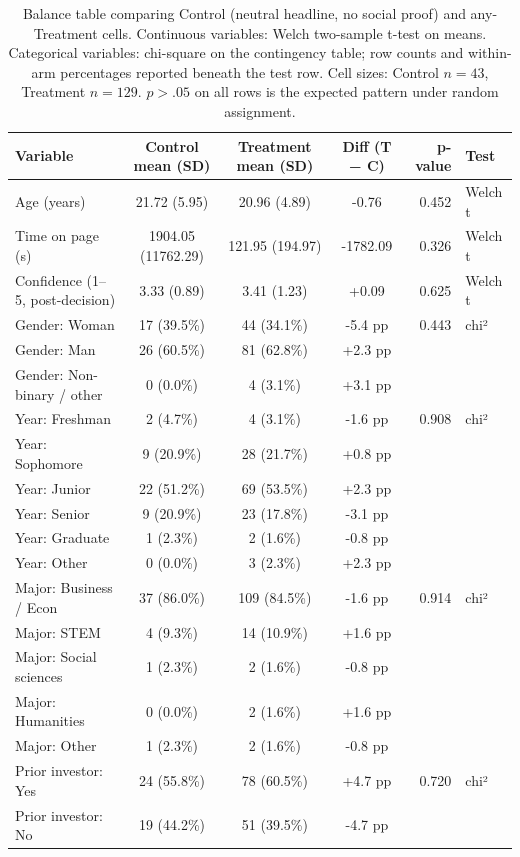 \begin{table}[!htbp]
  \centering
  \begin{threeparttable}
  \caption{Balance table comparing Control (neutral headline, no social proof) and any-Treatment cells. Continuous variables: Welch two-sample t-test on means. Categorical variables: chi-square on the contingency table; row counts and within-arm percentages reported beneath the test row. Cell sizes: Control $n=43$, Treatment $n=129$. $p>.05$ on all rows is the expected pattern under random assignment.}
  \label{tab:balance}
  \begin{tabular}{lcccrl}
\toprule
Variable & Control mean (SD) & Treatment mean (SD) & Diff (T − C) & p-value & Test \\
\midrule
Age (years) & 21.72 (5.95) & 20.96 (4.89) & -0.76 & 0.452 & Welch t \\
Time on page (s) & 1904.05 (11762.29) & 121.95 (194.97) & -1782.09 & 0.326 & Welch t \\
Confidence (1–5, post-decision) & 3.33 (0.89) & 3.41 (1.23) & +0.09 & 0.625 & Welch t \\
Gender: Woman & 17 (39.5\%) & 44 (34.1\%) & -5.4 pp & 0.443 & chi² \\
Gender: Man & 26 (60.5\%) & 81 (62.8\%) & +2.3 pp &  &  \\
Gender: Non-binary / other & 0 (0.0\%) & 4 (3.1\%) & +3.1 pp &  &  \\
Year: Freshman & 2 (4.7\%) & 4 (3.1\%) & -1.6 pp & 0.908 & chi² \\
Year: Sophomore & 9 (20.9\%) & 28 (21.7\%) & +0.8 pp &  &  \\
Year: Junior & 22 (51.2\%) & 69 (53.5\%) & +2.3 pp &  &  \\
Year: Senior & 9 (20.9\%) & 23 (17.8\%) & -3.1 pp &  &  \\
Year: Graduate & 1 (2.3\%) & 2 (1.6\%) & -0.8 pp &  &  \\
Year: Other & 0 (0.0\%) & 3 (2.3\%) & +2.3 pp &  &  \\
Major: Business / Econ & 37 (86.0\%) & 109 (84.5\%) & -1.6 pp & 0.914 & chi² \\
Major: STEM & 4 (9.3\%) & 14 (10.9\%) & +1.6 pp &  &  \\
Major: Social sciences & 1 (2.3\%) & 2 (1.6\%) & -0.8 pp &  &  \\
Major: Humanities & 0 (0.0\%) & 2 (1.6\%) & +1.6 pp &  &  \\
Major: Other & 1 (2.3\%) & 2 (1.6\%) & -0.8 pp &  &  \\
Prior investor: Yes & 24 (55.8\%) & 78 (60.5\%) & +4.7 pp & 0.720 & chi² \\
Prior investor: No & 19 (44.2\%) & 51 (39.5\%) & -4.7 pp &  &  \\
\bottomrule
\end{tabular}
  \end{threeparttable}
\end{table}
